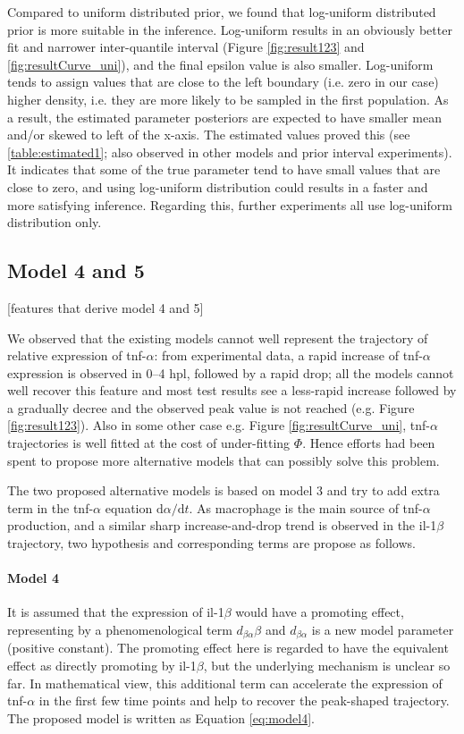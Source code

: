 Compared to uniform distributed prior, we found that log-uniform distributed prior is more suitable in the inference. Log-uniform results in an obviously better fit and narrower inter-quantile interval (Figure \ref{fig:result123} and \ref{fig:resultCurve_uni}), and the final epsilon value is also smaller. Log-uniform tends to assign values that are close to the left boundary (i.e. zero in our case) higher density, i.e. they are more likely to be sampled in the first population. As a result, the estimated parameter posteriors are expected to have smaller mean and/or skewed to left of the x-axis. The estimated values proved this (see \ref{table:estimated1}; also observed in other models and prior interval experiments). It indicates that some of the true parameter tend to have small values that are close to zero, and using log-uniform distribution could results in a faster and more satisfying inference. Regarding this, further experiments all use log-uniform distribution only.


\subsection{Model 4 and 5}

[features that derive model 4 and 5]

We observed that the existing models cannot well represent the trajectory of relative expression of tnf-$\alpha$: from experimental data, a rapid increase of tnf-$\alpha$ expression is observed in 0--4 hpl, followed by a rapid drop; all the models cannot well recover this feature and most test results see a less-rapid increase followed by a gradually decree and the observed peak value is not reached (e.g. Figure \ref{fig:result123}). Also in some other case e.g. Figure \ref{fig:resultCurve_uni}, tnf-$\alpha$ trajectories is well fitted at the cost of under-fitting $\Phi$. Hence efforts had been spent to propose more alternative models that can possibly solve this problem.

The two proposed alternative models is based on model 3 and try to add extra term in the tnf-$\alpha$ equation $\mathrm{d} \alpha/\mathrm{d} t$. As macrophage is the main source of tnf-$\alpha$ production, and a similar sharp increase-and-drop trend is observed in the il-1$\beta$ trajectory, two hypothesis and corresponding terms are propose as follows.

\paragraph{Model 4} It is assumed that the expression of il-1$\beta$ would have a promoting effect, representing by a phenomenological term $d_{\beta\alpha}\beta$ and $d_{\beta\alpha}$ is a new model parameter (positive constant). The promoting effect here is regarded to have the equivalent effect as directly promoting by il-1$\beta$, but the underlying mechanism is unclear so far. In mathematical view, this additional term can accelerate the expression of tnf-$\alpha$ in the first few time points and help to recover the peak-shaped trajectory. The proposed model is written as Equation \ref{eq:model4}.

